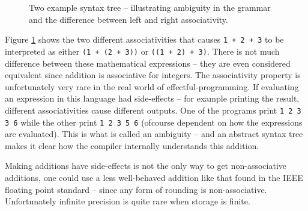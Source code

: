 \begin{figure}[h!]
\centering
\begin{subfigure}{.5\textwidth}
\centering
{}
\end{subfigure}%
\begin{subfigure}{.5\textwidth}
\centering
{}
\end{subfigure}
  \caption{Two example syntax tree -- illustrating ambiguity in the grammar and the difference between left and right associativity.}
  \label{fig:astExpr}
\end{figure}

Figure \ref{fig:astExpr} shows the two different associativities that causes \verb!1 + 2 + 3! to be interpreted as either \verb!(1 + (2 + 3))! or \verb!((1 + 2) + 3)!. There is not much difference between these mathematical expressions -- they are even considered equivalent since addition is associative for integers. The associativity property is unfortunately very rare in the real world of effectful-programming. If evaluating an expression in this language had side-effects -- for example printing the result, different associativities cause different outputs. One of the programs print \verb+1 2 3 3 6+ while the other print \verb+1 2 3 5 6+ (ofcourse dependent on how the expressions are evaluated). This is what is called an ambiguity -- and an abstract syntax tree makes it clear how the compiler internally understands this addition.

Making additions have side-effects is not the only way to get non-associative additions, one could use a less well-behaved addition like that found in the IEEE floating point standard -- since any form of rounding is non-associative. Unfortunately infinite precision is quite rare when storage is finite.

